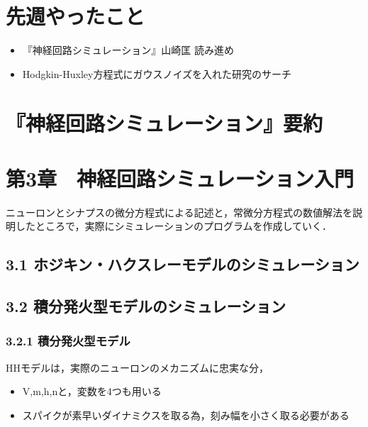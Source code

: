 \documentclass[dvipdfmx, A4j, twocolumn, 10.5pt]{jsarticle}
\begin{document}


\section{先週やったこと}
\begin{itemize}
 \item 『神経回路シミュレーション』山崎匡 読み進め
 \item Hodgkin-Huxley方程式にガウスノイズを入れた研究のサーチ

\end{itemize}
\section{『神経回路シミュレーション』要約}


\section*{第3章　神経回路シミュレーション入門}

ニューロンとシナプスの微分方程式による記述と，常微分方程式の数値解法を説明したところで，実際にシミュレーションのプログラムを作成していく．


\subsection*{3.1 ホジキン・ハクスレーモデルのシミュレーション}


\subsection*{3.2 積分発火型モデルのシミュレーション}
\subsubsection*{3.2.1 積分発火型モデル}

HHモデルは，実際のニューロンのメカニズムに忠実な分，
\begin{itemize}
 \item V,m,h,nと，変数を4つも用いる
 \item スパイクが素早いダイナミクスを取る為，刻み幅を小さく取る必要がある
\end{itemize}
\end{document}
